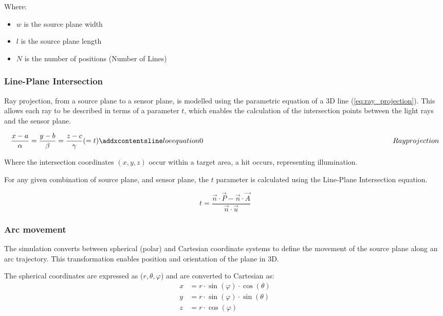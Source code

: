 Where:
\begin{itemize}
    \item $w$ is the source plane width
    \item $l$ is the source plane length
    \item $N$ is the number of positions (Number of Lines)
\end{itemize}


\subsubsection{Line-Plane Intersection}
Ray projection, from a source plane to a sensor plane, is modelled using the parametric equation of a 3D line (\ref{eq:ray_projection}). This allows each ray to be described in terms of a parameter $t$, which enables the calculation of the intersection points between the light rays and the sensor plane. 

\begin{equation}
\frac{x - a}{\alpha} = \frac{y - b}{\beta} = \frac{z - c}{\gamma} (=t)
\label{eq:ray_projection}
\addequation{Ray projection}
\end{equation}

Where the intersection coordinates $(x,y,z)$ occur within a target area, a hit occurs, representing illumination.

For any given combination of source plane, and sensor plane, the $t$ parameter is calculated using the Line-Plane Intersection equation.

\begin{equation}
    t = \frac{\vec{n} \cdot \vec{P} - \vec{n} \cdot \vec{A}}{\vec{n} \cdot \vec{u}}
    \label{eq:Line_Plane_Intersection}
\end{equation}

\subsubsection{Arc movement}
The simulation converts between spherical (polar) and Cartesian coordinate systems to define the movement of the source plane along an arc trajectory. This transformation enables position and orientation of the plane in 3D. 

The spherical coordinates are expressed as ($r, \theta, \varphi$) and are converted to Cartesian as:
\begin{align}
x &= r \cdot \sin(\varphi) \cdot \cos(\theta) \\
y &= r \cdot \sin(\varphi) \cdot \sin(\theta) \\
z &= r \cdot \cos(\varphi)
\end{align}

